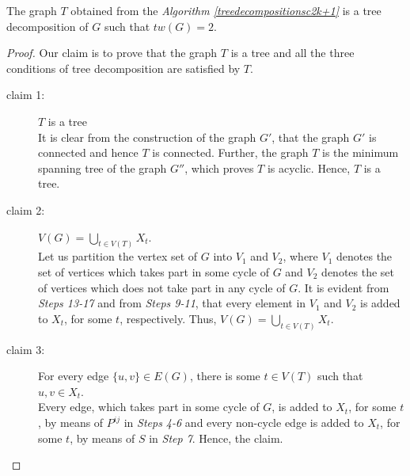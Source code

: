 \documentclass[runningheads]{llncs}
\begin{document}
\begin{theorem}\label{prooftreedecomp2k+1}
The graph $T$ obtained from the \emph{Algorithm \ref{treedecompositionsc2k+1}} is a tree decomposition of $G$ such that $tw(G) = 2$.
\end{theorem}
\begin{proof}
 Our claim is to prove that the graph $T$ is a tree and all the three conditions of tree decomposition are satisfied by $T$.
\begin{description}
\item[claim 1:] $T$ is a tree \\
It is clear from the construction of the graph $G'$, that the graph $G'$ is connected and hence $T$ is connected. Further, the graph $T$ is the minimum spanning tree of the graph $G''$, which proves $T$ is acyclic. Hence, $T$ is a tree.
\item[claim 2:] $V(G) = \bigcup_{t \in V(T)} X_t$. \\
Let us partition the vertex set of $G$ into $V_1$ and $V_2$, where $V_1$ denotes the set of vertices which takes part in some cycle of $G$ and $V_2$ denotes the set of vertices which does not take part in any cycle of $G$. It is evident from \emph{Steps 13-17} and from \emph{Steps 9-11}, that every element in $V_1$ and $V_2$ is added to $X_t$, for some $t$, respectively. Thus, $V(G) = \bigcup_{t \in V(T)} X_t$. 

\item[claim 3:] For every edge $\{u,v\} \in E(G)$, there is some $t \in V(T)$ such that $u, v \in X_t$. \\
Every edge, which takes part in some cycle of $G$, is added to $X_t$, for some $t$, by means of $P^{ij}$ in \emph{Steps 4-6} and every non-cycle edge is added to $X_t$, for some $t$, by means of $S$ in \emph{Step 7}. Hence, the claim.



\end{description}
\end{proof}
\end{document}
